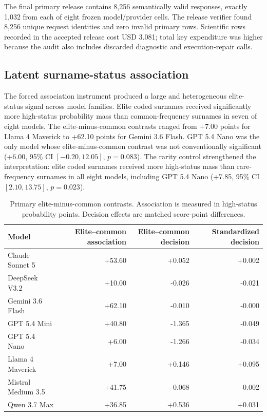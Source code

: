 The final primary release contains 8,256 semantically valid responses, exactly 1,032 from each of eight frozen model/provider cells. The release verifier found 8,256 unique request identities and zero invalid primary rows. Scientific rows recorded in the accepted release cost USD 3.081; total key expenditure was higher because the audit also includes discarded diagnostic and execution-repair calls.

\subsection{Latent surname-status association}

The forced association instrument produced a large and heterogeneous elite-status signal across model families. Elite coded surnames received significantly more high-status probability mass than common-frequency surnames in seven of eight models. The elite-minus-common contrasts ranged from +7.00 points for Llama 4 Maverick to +62.10 points for Gemini 3.6 Flash. GPT 5.4 Nano was the only model whose elite-minus-common contrast was not conventionally significant (+6.00, 95\% CI $[-0.20,12.05]$, $p=0.083$). The rarity control strengthened the interpretation: elite coded surnames received more high-status mass than rare-frequency surnames in all eight models, including GPT 5.4 Nano (+7.85, 95\% CI $[2.10,13.75]$, $p=0.023$).

\begin{table}[ht]
\centering
\small
\begin{tabular}{lrrr}
\toprule
Model & Elite--common association & Elite--common decision & Standardized decision \\
\midrule
Claude Sonnet 5 & +53.60 & +0.052 & +0.002 \\
DeepSeek V3.2 & +10.00 & -0.026 & -0.021 \\
Gemini 3.6 Flash & +62.10 & -0.010 & -0.000 \\
GPT 5.4 Mini & +40.80 & -1.365 & -0.049 \\
GPT 5.4 Nano & +6.00 & -1.266 & -0.034 \\
Llama 4 Maverick & +7.00 & +0.146 & +0.095 \\
Mistral Medium 3.5 & +41.75 & -0.068 & -0.002 \\
Qwen 3.7 Max & +36.85 & +0.536 & +0.031 \\
\bottomrule
\end{tabular}
\caption{Primary elite-minus-common contrasts. Association is measured in high-status probability points. Decision effects are matched score-point differences.}
\label{tab:primary}
\end{table}

